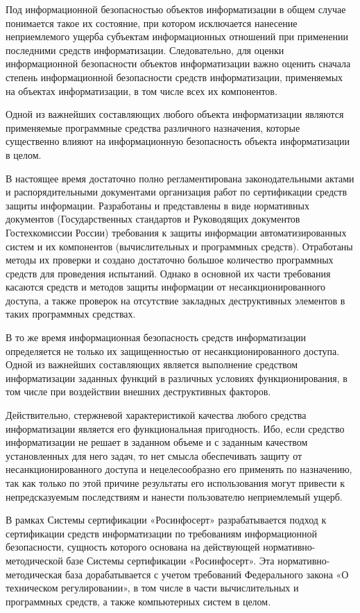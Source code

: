 Под информационной безопасностью объектов информатизации в общем случае понимается такое их состояние, при котором исключается нанесение неприемлемого ущерба субъектам информационных отношений при применении последними средств информатизации. Следовательно, для оценки информационной безопасности объектов информатизации важно оценить сначала степень информационной безопасности средств информатизации, применяемых на объектах информатизации, в том числе всех их компонентов.

Одной из важнейших составляющих любого объекта информатизации являются применяемые программные средства различного назначения, которые существенно влияют на информационную безопасность объекта информатизации в целом.

В настоящее время достаточно полно регламентирована законодательными актами и распорядительными документами организация работ по сертификации средств защиты информации. Разработаны и представлены в виде нормативных документов (Государственных стандартов и Руководящих документов Гостехкомиссии России) требования к защиты информации автоматизированных систем и их компонентов (вычислительных и программных средств). Отработаны методы их проверки и создано достаточно большое количество программных средств для проведения испытаний. Однако в основной их части требования касаются средств и методов защиты информации от несанкционированного доступа, а также проверок на отсутствие закладных деструктивных элементов в таких программных средствах.

В то же время информационная безопасность средств информатизации определяется не только их защищенностью от несанкционированного доступа. Одной из важнейших составляющих является выполнение средством информатизации заданных функций в различных условиях функционирования, в том числе при воздействии внешних деструктивных факторов.

Действительно, стержневой характеристикой качества любого средства информатизации является его функциональная пригодность. Ибо, если средство информатизации не решает в заданном объеме и с заданным качеством установленных для него задач, то нет смысла обеспечивать защиту от несанкционированного доступа и нецелесообразно его применять по назначению, так как только по этой причине результаты его использования могут привести к непредсказуемым последствиям и нанести пользователю неприемлемый ущерб.

В рамках Системы сертификации «Росинфосерт» разрабатывается подход к сертификации средств информатизации по требованиям информационной безопасности, сущность которого основана на действующей нормативно-методической базе Системы сертификации «Росинфосерт». Эта нормативно-методическая база дорабатывается с учетом требований Федерального закона «О техническом регулировании», в том числе в части вычислительных и программных средств, а также компьютерных систем в целом.

